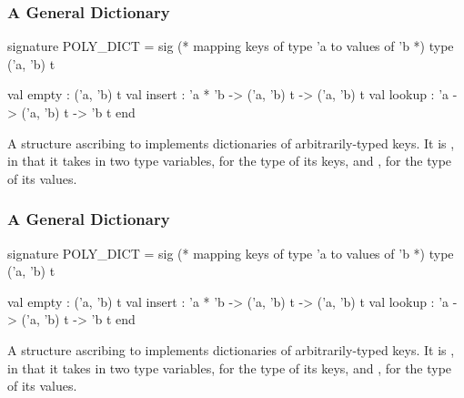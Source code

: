 \documentclass[aspectratio=169]{beamer}
\begin{document}
\begin{frame}[fragile]
  \frametitle{A General Dictionary}

  \begin{codeblock}
    signature POLY_DICT =
      sig
        (* mapping keys of type 'a to values of 'b *)
        type ('a, 'b) t

        val empty : ('a, 'b) t
        val insert : 'a * 'b -> ('a, 'b) t -> ('a, 'b) t
        val lookup : 'a -> ('a, 'b) t -> 'b t
      end
  \end{codeblock}

  A structure ascribing to  implements dictionaries of
  arbitrarily-typed keys. It is , in that it
  takes in two type variables,  for the type of its keys, and
  , for the type of its values.
\end{frame}

\begin{frame}[fragile]
  \frametitle{A General Dictionary}

  \begin{codeblock}
    signature POLY_DICT =
      sig
        (* mapping keys of type 'a to values of 'b *)
        type ('a, 'b) t

        val empty : ('a, 'b) t
        val insert : 'a * 'b -> ('a, 'b) t -> ('a, 'b) t
        val lookup : 'a -> ('a, 'b) t -> 'b t
      end
  \end{codeblock}

  A structure ascribing to  implements dictionaries of
  arbitrarily-typed keys. It is , in that it
  takes in two type variables,  for the type of its keys, and
  , for the type of its values.
\end{frame}
\end{document}
